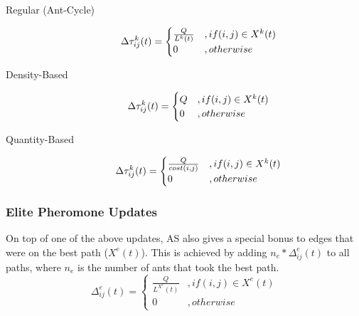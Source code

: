 \begin{description}
\item[Regular (Ant-Cycle)]     
\begin{equation}
 \Delta \tau_{ij}^k(t) =  
    \begin{cases}
         $$ \frac{Q}{L^k(t)}  $$ &, if $$ (i,j) \in X^k(t) $$ \\ 
        0 &, otherwise
    \end{cases}    
\end{equation}

\item[Density-Based] 
\begin{equation}
    \Delta \tau_{ij}^k(t) =  
    \begin{cases}
         $$ Q  $$ &, if $$ (i,j) \in X^k(t) $$ \\ 
        0 &, otherwise
    \end{cases} 
\end{equation}
\item[Quantity-Based]  
\begin{equation}
\Delta \tau_{ij}^k(t) =  
    \begin{cases}
         $$ \frac{Q}{cost(i,j)}  $$ &, if $$ (i,j) \in X^k(t) $$ \\ 
        0 &, otherwise
    \end{cases}    
\end{equation}
\end{description}

\subsubsection{Elite Pheromone Updates}
On top of one of the above updates, AS also gives a special bonus to edges that were on the best path ($X^e(t)$). This is achieved by adding $n_e * \Delta_{ij}^e(t)$ to all paths, where $n_e$ is the number of ants that took the best path. 
\begin{equation}
\Delta_{ij}^e(t) = 
\begin{cases}
\frac{Q}{L^{X^e}(t)} &, if (i,j) \in X^e(t) \\
0 &, otherwise
\end{cases}
\end{equation}
